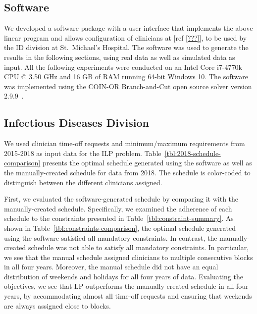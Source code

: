 \subsection{Software}
We developed a software package with a user interface that implements the above
linear program and allows configuration of clinicians at [ref \ref{???}], to be
used by the ID division at St.\ Michael's Hospital. The software was used to
generate the results in the following sections, using real data as well as
simulated data as input. All the following experiments were conducted on an
Intel Core i7-4770k CPU @ 3.50 GHz and 16 GB of RAM running 64-bit Windows 10.
The software was implemented using the COIN-OR Branch-and-Cut open source solver
version 2.9.9~\cite{johnjforrest_coin-or/cbc:_2019}.

\subsection{Infectious Diseases Division}  %
We used clinician time-off requests and minimum/maximum requirements from
2015-2018 as input data for the ILP problem. Table~\ref{tbl:2018-schedule-comparison} presents the optimal schedule generated using
the software as well as the manually-created schedule for data from 2018. The
schedule is color-coded to distinguish between the different clinicians
assigned.



First, we evaluated the software-generated schedule by comparing it with the
manually-created schedule. Specifically, we examined the adherence of each
schedule to the constraints presented in Table~\ref{tbl:constraint-summary}. As
shown in Table~\ref{tbl:constraints-comparison}, the optimal schedule generated
using the software satisfied all mandatory constraints. In contrast, the
manually-created schedule was not able to satisfy all mandatory constraints. In
particular, we see that the manual schedule assigned clinicians to multiple
consecutive blocks in all four years. Moreover, the manual schedule did not have
an equal distribution of weekends and holidays for all four years of data.
Evaluating the objectives, we see that LP outperforms the manually created
schedule in all four years, by accommodating almost all time-off requests and
ensuring that weekends are always assigned close to blocks.

